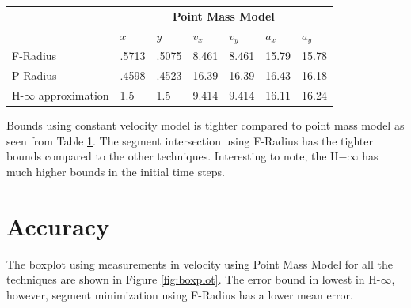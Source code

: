 \begin{table}[htbp]
\begin{tabular}{l l l l l l l}
		& \multicolumn{6}{c}{\textbf{Point Mass Model}}\\
		 & \textbf{$x$} & \textbf{$y$} & \textbf{$v_x$} & \textbf{$v_y$} & \textbf{$a_x$} & \textbf{$a_y$}\\ \midrule
		F-Radius & .5713 &	.5075 &	8.461	& 8.461 &	15.79 &	15.78\\
		P-Radius & .4598 &	.4523 &	16.39 &	16.39 &	16.43 &	16.18\\
		H-$\infty$ approximation & 1.5 & 1.5 & 9.414 &	9.414 &	16.11 &	16.24\\
		\bottomrule
	\end{tabular}
	\label{tab:bound}
\end{table}
Bounds using constant velocity model is tighter compared to point mass model as seen from Table \ref{tab:bound}. The segment intersection using F-Radius has the tighter bounds compared to the other techniques. Interesting to note, the H$-\infty$ has much higher bounds in the initial time steps.


\section{Accuracy}
The boxplot using measurements in velocity using Point Mass Model for all the techniques are shown in Figure \ref{fig:boxplot}. The error bound in lowest in H-$\infty$, however, segment minimization using F-Radius has a lower mean error.

